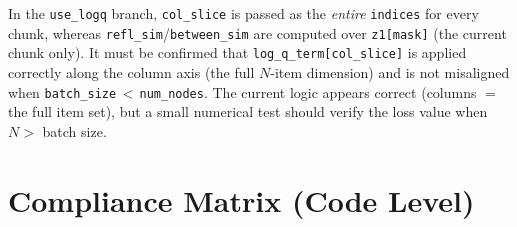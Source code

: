 \documentclass[11pt, a4paper]{article}
\begin{document}
In the \texttt{use\_logq} branch, \texttt{col\_slice} is passed as the \emph{entire}
\texttt{indices} for every chunk, whereas \texttt{refl\_sim}/\texttt{between\_sim} are
computed over \texttt{z1[mask]} (the current chunk only). It must be confirmed that
\texttt{log\_q\_term[col\_slice]} is applied correctly along the column axis (the full
$N$-item dimension) and is not misaligned when \texttt{batch\_size}\,$<$\,\texttt{num\_nodes}.
The current logic appears correct (columns $=$ the full item set), but a small numerical
test should verify the loss value when $N >$ batch size.

\section{Compliance Matrix (Code Level)}
\end{document}
